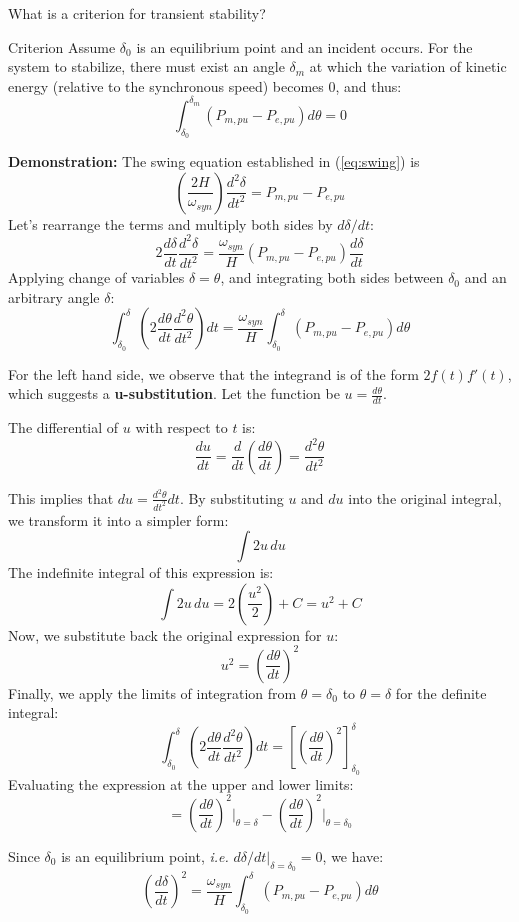 \begin{frame}[allowframebreaks]{What is a criterion for transient stability?}

\begin{block}{Criterion}
Assume $\delta_0$ is an equilibrium point and an incident occurs. For the system to stabilize, there must exist an angle $\delta_{m}$ at which the variation of kinetic energy (relative to the synchronous speed) becomes 0, and thus:
$$\int_{\delta_0}^{\delta_m} \left(P_{m,pu}-P_{e,pu}\right) d\theta = 0$$    
\end{block}

\textbf{Demonstration:}
The swing equation established in (\ref{eq:swing}) is
$$\left(\frac{2H}{\omega_{syn}}\right) \frac{d^2\delta}{dt^2} = P_{m,pu} - P_{e,pu}$$
Let's rearrange the terms and multiply both sides by $d\delta/dt$:
$$2\frac{d\delta}{dt}\frac{d^2\delta}{dt^2} = \frac{\omega_{syn}}{H}\left(P_{m,pu}-P_{e,pu}\right)\frac{d\delta}{dt}$$
Applying change of variables $\delta = \theta$, and integrating both sides between $\delta_0$ and an arbitrary angle $\delta$:
$$\int_{\delta_0}^{\delta} \left(2\frac{d\theta}{dt}\frac{d^2\theta}{dt^2}\right) dt = \frac{\omega_{syn}}{H}\int_{\delta_0}^{\delta} \left(P_{m,pu}-P_{e,pu}\right)d\theta$$


For the left hand side, we observe that the integrand is of the form $2f(t)f'(t)$, which suggests a \textbf{u-substitution}.
Let the function be $u = \frac{d\theta}{dt}$.

The differential of $u$ with respect to $t$ is:
$$ \frac{du}{dt} = \frac{d}{dt}\left(\frac{d\theta}{dt}\right) = \frac{d^2\theta}{dt^2} $$

This implies that $ du = \frac{d^2\theta}{dt^2} dt $.
By substituting $u$ and $du$ into the original integral, we transform it into a simpler form:
$$ \int 2u \, du $$
The indefinite integral of this expression is:
$$ \int 2u \, du = 2\left(\frac{u^2}{2}\right) + C = u^2 + C $$
Now, we substitute back the original expression for $u$:
$$ u^2 = \left(\frac{d\theta}{dt}\right)^2 $$
Finally, we apply the limits of integration from $\theta = \delta_0$ to $\theta = \delta$ for the definite integral:
$$ \int_{\delta_0}^{\delta} \left(2\frac{d\theta}{dt}\frac{d^2\theta}{dt^2}\right) dt = \left[\left(\frac{d\theta}{dt}\right)^2\right]_{\delta_0}^{\delta} $$
Evaluating the expression at the upper and lower limits:
$$ = \left(\frac{d\theta}{dt}\right)^2\bigg|_{\theta=\delta} - \left(\frac{d\theta}{dt}\right)^2\bigg|_{\theta=\delta_0} $$


Since $\delta_0$ is an equilibrium point, \emph{i.e.} $d\delta/dt|_{\delta = \delta_0} = 0$, we have:
$$\left(\frac{d\delta}{dt}\right)^2 = \frac{\omega_{syn}}{H}\int_{\delta_0}^{\delta} \left(P_{m,pu}-P_{e,pu}\right) d\theta$$



\end{frame}
